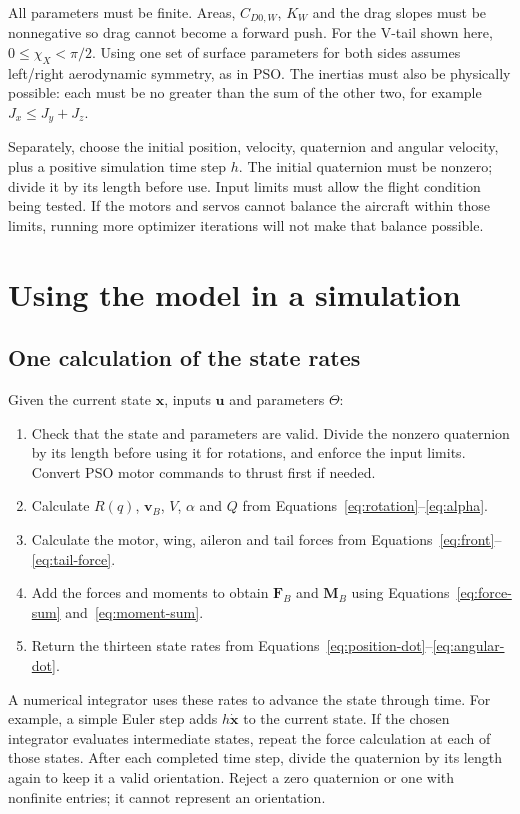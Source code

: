 \documentclass[11pt,a4paper]{article}
\numberwithin{equation}{section}
\newcommand{\vect}[1]{\boldsymbol{#1}}
\begin{document}
\normalsize
All parameters must be finite. Areas, $C_{D0,W}$, $K_W$ and the drag slopes
must be nonnegative so drag cannot become a forward push.
For the V-tail shown here, $0\leq\chi_X<\pi/2$.
Using one set of surface parameters for both sides assumes left/right
aerodynamic symmetry, as in PSO.
The inertias must also be physically possible: each must be no greater than
the sum of the other two, for example $J_x\leq J_y+J_z$.

Separately, choose the initial position, velocity, quaternion and angular
velocity, plus a positive simulation time step $h$.
The initial quaternion must be nonzero; divide it by its length before use.
Input limits must allow the flight condition being tested. If the motors
and servos cannot balance the aircraft within those limits, running more
optimizer iterations will not make that balance possible.

\section{Using the model in a simulation}
\subsection{One calculation of the state rates}
Given the current state $\vect x$, inputs $\vect u$ and parameters $\Theta$:
\begin{enumerate}
 \item Check that the state and parameters are valid. Divide the nonzero
 quaternion by its length before using it for rotations, and enforce the
 input limits. Convert PSO motor commands to thrust first if needed.
 \item Calculate $R(q)$, $\vect v_B$, $V$, $\alpha$ and $Q$ from
 Equations~\eqref{eq:rotation}--\eqref{eq:alpha}.
 \item Calculate the motor, wing, aileron and tail forces from
 Equations~\eqref{eq:front}--\eqref{eq:tail-force}.
 \item Add the forces and moments to obtain $\vect F_B$ and $\vect M_B$ using
 Equations~\eqref{eq:force-sum} and~\eqref{eq:moment-sum}.
 \item Return the thirteen state rates from
 Equations~\eqref{eq:position-dot}--\eqref{eq:angular-dot}.
\end{enumerate}
A numerical integrator uses these rates to advance the state through time.
For example, a simple Euler step adds $h\dot{\vect x}$ to the current state.
If the chosen integrator evaluates intermediate states, repeat the force
calculation at each of those states. After each completed time step,
divide the quaternion by its length again to keep it a valid orientation.
Reject a zero quaternion or one with nonfinite entries; it cannot represent
an orientation.
\end{document}
